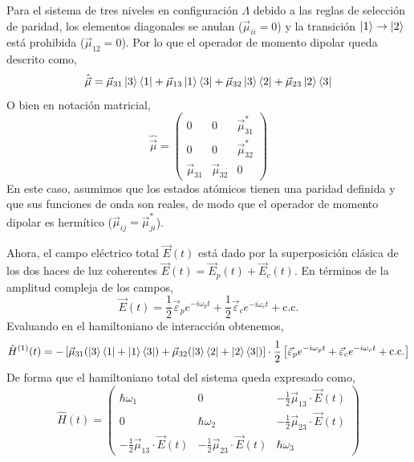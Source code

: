 Para el sistema de tres niveles en configuración $\Lambda$ debido a las reglas de selección de paridad, los elementos diagonales se anulan ($\vec{\mu}_{ii} =0$) y la transición $\ket{1} \to \ket{2}$ está prohibida ($\vec{\mu}_{12} = 0$). Por lo que el operador de momento dipolar queda descrito como, 
\begin{equation}
\hat{\vec{\mu}}= \vec{\mu}_{31} \ket{3}\bra{1} +  \vec{\mu}_{13} \ket{1}\bra{3} + \vec{\mu}_{32} \ket{3}\bra{2} + \vec{\mu}_{23} \ket{2}\bra{3}
\end{equation}
O bien en notación matricial,
\begin{equation}
    \hat{\vec{\mu}} = \begin{pmatrix}
        0 & 0 & \vec{\mu}_{31}^* \\ 
        0 & 0 & \vec{\mu}_{32}^*\\
        \vec{\mu}_{31} & \vec{\mu}_{32} & 0
    \end{pmatrix}
\end{equation}
En este caso, asumimos que los estados atómicos tienen una paridad definida y que sus funciones de onda son reales, de modo que el operador de momento dipolar es hermítico ($\vec{\mu}_{ij} = \vec{\mu}_{ji}^*$).

Ahora, el campo eléctrico total $\vec{E}(t)$ está dado por la superposición clásica de los dos haces de luz coherentes $\vec{E}(t) = \vec{E}_p(t) + \vec{E}_c(t)$. En términos de la amplitud compleja de los campos,
\begin{equation}
    \vec{E}(t) = \frac{1}{2}\vec{\varepsilon}_p e^{-i\omega_p t} + \frac{1}{2}\vec{\varepsilon}_c e^{-i\omega_c t} + \text{c.c.}
\end{equation}
Evaluando en el hamiltoniano de interacción obtenemos,
\begin{equation}
\hat{H}^{(1)}(t) = - \left[ \vec{\mu}_{31} (\ket{3}\bra{1} + \ket{1}\bra{3}) + \vec{\mu}_{32} (\ket{3}\bra{2} + \ket{2}\bra{3}) \right] \cdot \frac{1}{2} \left[ \vec{\varepsilon}_p e^{-i\omega_p t} + \vec{\varepsilon}_c e^{-i\omega_c t} + \text{c.c.} \right]
\end{equation}
De forma que el hamiltoniano total del sistema queda expresado como,
\begin{equation}
    \hat{H}(t) = \begin{pmatrix}
    \hbar \omega_1 & 0 & - \frac{1}{2}\vec{\mu}_{13} \cdot \vec{E}(t) \\
    0 & \hbar \omega_2 & - \frac{1}{2}\vec{\mu}_{23} \cdot \vec{E}(t) \\
    -\frac{1}{2}\vec{\mu}_{13} \cdot \vec{E}(t) & -\frac{1}{2}\vec{\mu}_{23} \cdot \vec{E}(t) & \hbar \omega_3
    \end{pmatrix}
\end{equation}

